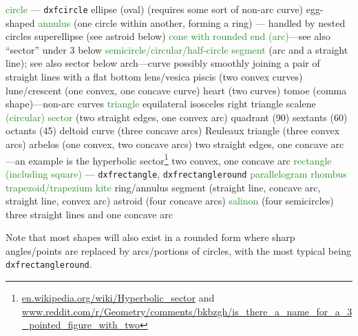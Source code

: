 \documentclass{ltxdoc}
\begin{document}
\begin{outline}
   \2 \textcolor{ForestGreen}{circle} --- \verb|dxfcircle|
   \2 ellipse (oval) (requires some sort of non-arc curve)
      \3 egg-shaped
   \2 \textcolor{ForestGreen}{annulus} (one circle within another, forming  a ring) --- handled by nested circles
   \2 superellipse (see astroid below)
   \2 \textcolor{ForestGreen}{cone with rounded end (arc)}---see also ``sector'' under 3 below
   \2 \textcolor{ForestGreen}{semicircle/circular/half-circle segment} (arc and a straight line); see also sector below
   \2 arch---curve possibly smoothly joining a  pair of straight lines with a flat bottom
   \2 lens/vesica piscis (two convex curves)
   \2 lune/crescent (one convex, one concave  curve)
   \2 heart (two curves)
   \2 tomoe (comma shape)---non-arc curves
   \2 \textcolor{ForestGreen}{triangle}
      \3 equilateral
      \3 isosceles
      \3 right triangle
      \3 scalene
   \2 \textcolor{ForestGreen}{(circular) sector} (two straight edges, one convex arc)
      \3 quadrant (90\textdegree)
      \3 sextants (60\textdegree)
      \3 octants (45\textdegree)
   \2 deltoid curve (three concave arcs)
   \2  Reuleaux triangle (three convex arcs)
   \2 arbelos (one convex, two concave arcs)
   \2 two straight edges, one concave arc---an example is the hyperbolic sector\footnote{\url{en.wikipedia.org/wiki/Hyperbolic_sector} and
 \url{www.reddit.com/r/Geometry/comments/bkbzgh/is_there_a_name_for_a_3_pointed_figure_with_two}}
   \2 two convex, one concave arc
   \2 \textcolor{ForestGreen}{rectangle (including square)} --- \verb|dxfrectangle|, \verb|dxfrectangleround|
   \2 \textcolor{ForestGreen}{parallelogram}
   \2 \textcolor{ForestGreen}{rhombus}
   \2 \textcolor{ForestGreen}{trapezoid/trapezium}
   \2 \textcolor{ForestGreen}{kite}
   \2 ring/annulus segment (straight line, concave arc, straight line, convex arc)
   \2 astroid (four concave arcs)
   \2 \textcolor{ForestGreen}{salinon} (four semicircles)
   \2 three straight lines and one concave arc
\end{outline}

Note that most shapes will also exist in a rounded form where sharp angles/points are replaced by arcs/portions of circles, with the most typical being \verb|dxfrectangleround|.
\end{document}

